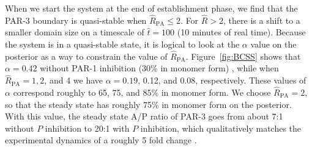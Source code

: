 \documentclass[11pt]{article}
\newcommand{\6}[1]{#1_{\text{6}}}
\newcommand{\3}[1]{#1_{\text{3}}}
\begin{document}
When we start the system at the end of establishment phase, we find that the PAR-3 boundary is quasi-stable when $\hat R_\text{PA} \leq 2$. For $\hat R > 2$, there is a shift to a smaller domain size on a timescale of $\hat t = 100$ (10 minutes of real time). Because the system is in a quasi-stable state, it is logical to look at the $\alpha$ value on the posterior as a way to constrain the value of $\hat R_\text{PA}$. Figure\ \ref{fig:BCSS} shows that $\alpha=0.42$ without PAR-1 inhibition (30\% in monomer form) \cite{lang2023oligomerization}, while when $\hat R_\text{PA}=1,2$, and 4 we have $\alpha=0.19$, 0.12, and 0.08, respectively. These values of $\alpha$ correspond roughly to 65, 75, and 85\% in monomer form. We choose $\hat R_\text{PA}=2$, so that the steady state has roughly 75\% in monomer form on the posterior.  With this value, the steady state A/P ratio of PAR-3 goes from about 7:1 without $P$ inhibition to 20:1 with $P$ inhibition, which qualitatively matches the experimental dynamics of a roughly 5 fold change \cite[Fig.~4c]{sailer2015dynamic}. 

\newpage
\end{document}
